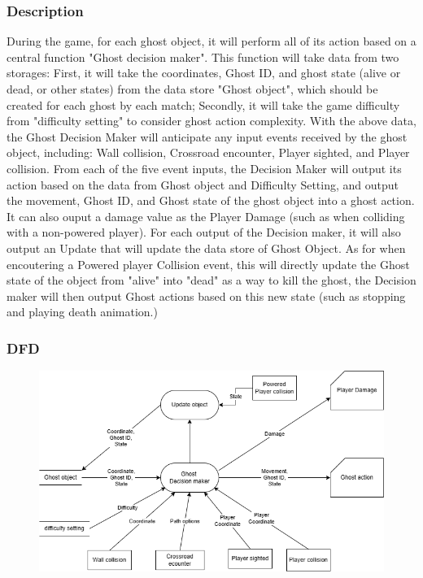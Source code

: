 \documentclass[11pt]{article}
\begin{document}
\subsubsection{Description}
During the game, for each ghost object, it will perform all of its action based on a central function "Ghost decision maker". This function will take data from two storages: First, it will take the coordinates, Ghost ID, and ghost state (alive or dead, or other states) from the data store "Ghost object", which should be created for each ghost by each match; Secondly, it will take the game difficulty from "difficulty setting" to consider ghost action complexity. With the above data, the Ghost Decision Maker will anticipate any input events received by the ghost object, including: Wall collision, Crossroad encounter, Player sighted, and Player collision. From each of the five event inputs, the Decision Maker will output its action based on the data from Ghost object and Difficulty Setting, and output the movement, Ghost ID, and Ghost state of the ghost object into a ghost action. It can also ouput a damage value as the Player Damage (such as when colliding with a non-powered player). For each output of the Decision maker, it will also output an Update that will update the data store of Ghost Object. As for when encoutering a Powered player Collision event, this will directly update the Ghost state of the object from "alive" into "dead" as a way to kill the ghost, the Decision maker will then output Ghost actions based on this new state (such as stopping and playing death animation.)
\subsubsection{DFD}
\begin{figure}[H]
    \centering
    \includegraphics*[scale=0.4]{GhostAI_DFD.png}
\end{figure}
\end{document}
